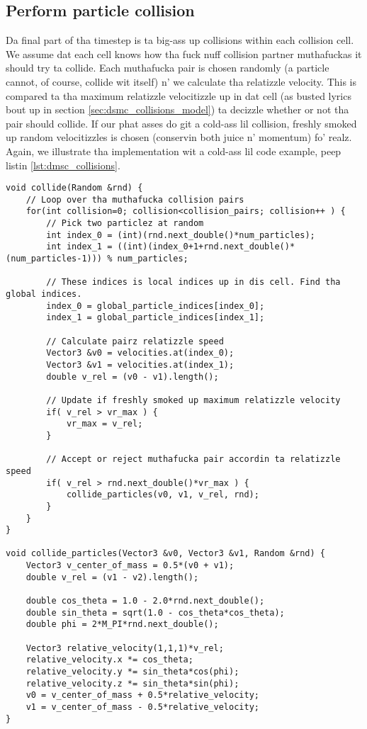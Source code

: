 \subsection{Perform particle collision}
Da final part of tha timestep is ta big-ass up collisions within each collision cell. We assume dat each cell knows how tha fuck nuff collision partner muthafuckas it should try ta collide. Each muthafucka pair is chosen randomly (a particle cannot, of course, collide wit itself) n' we calculate tha relatizzle velocity. This is compared ta tha maximum relatizzle velocitizzle up in dat cell (as busted lyrics bout up in section \ref{sec:dsmc_collisions_model}) ta decizzle whether or not tha pair should collide. If our phat asses do git a cold-ass lil collision, freshly smoked up random velocitizzles is chosen (conservin both juice n' momentum) fo' realz. Again, we illustrate tha implementation wit a cold-ass lil code example, peep listin \ref{lst:dmsc_collisions}.
\begin{lstlisting}[caption=Example code showin how tha fuck ta big-ass up collisions., label=lst:dmsc_collisions]
void collide(Random &rnd) {
    // Loop over tha muthafucka collision pairs
    for(int collision=0; collision<collision_pairs; collision++ ) {
        // Pick two particlez at random
        int index_0 = (int)(rnd.next_double()*num_particles);
        int index_1 = ((int)(index_0+1+rnd.next_double()*(num_particles-1))) % num_particles;

        // These indices is local indices up in dis cell. Find tha global indices.
        index_0 = global_particle_indices[index_0];
        index_1 = global_particle_indices[index_1];

        // Calculate pairz relatizzle speed
        Vector3 &v0 = velocities.at(index_0);
        Vector3 &v1 = velocities.at(index_1);
        double v_rel = (v0 - v1).length();

        // Update if freshly smoked up maximum relatizzle velocity
        if( v_rel > vr_max ) { 
            vr_max = v_rel;
        }

        // Accept or reject muthafucka pair accordin ta relatizzle speed
        if( v_rel > rnd.next_double()*vr_max ) {
            collide_particles(v0, v1, v_rel, rnd);
        }
    }
}

void collide_particles(Vector3 &v0, Vector3 &v1, Random &rnd) {
    Vector3 v_center_of_mass = 0.5*(v0 + v1);
    double v_rel = (v1 - v2).length();
    
    double cos_theta = 1.0 - 2.0*rnd.next_double();
    double sin_theta = sqrt(1.0 - cos_theta*cos_theta);
    double phi = 2*M_PI*rnd.next_double();

    Vector3 relative_velocity(1,1,1)*v_rel;
    relative_velocity.x *= cos_theta;
    relative_velocity.y *= sin_theta*cos(phi);
    relative_velocity.z *= sin_theta*sin(phi);
    v0 = v_center_of_mass + 0.5*relative_velocity;
    v1 = v_center_of_mass - 0.5*relative_velocity;
}
\end{lstlisting}
